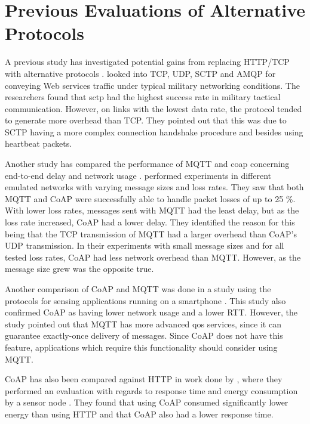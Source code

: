 \section{Previous Evaluations of Alternative Protocols}

A previous study has investigated potential gains from replacing HTTP/TCP with
alternative protocols \cite{evaluation-transport-protocols-web-services}.
 looked into TCP, UDP,
SCTP and AMQP for conveying Web services traffic under typical military
networking conditions. The researchers found that \gls{sctp} had the highest
success rate in military tactical communication. However, on links with the
lowest data rate, the protocol tended to generate more overhead than TCP. They
pointed out that this was due to SCTP having a more complex connection handshake
procedure and besides using heartbeat packets.

Another study has compared the performance of MQTT and \gls{coap} concerning
end-to-end delay and network usage \cite{thangavel-mqtt-coap}.
 performed experiments in different emulated
networks with varying message sizes and loss rates. They saw that both MQTT and
CoAP were successfully able to handle packet losses of up to 25 \%. With lower
loss rates, messages sent with MQTT had the least delay, but as the loss rate
increased, CoAP had a lower delay. They identified the reason for this being
that the TCP transmission of MQTT had a larger overhead than CoAP's UDP
transmission. In their experiments with small message sizes and for all tested
loss rates, CoAP had less network overhead than MQTT. However, as the message
size grew was the opposite true.

Another comparison of CoAP and MQTT was done in a study using the protocols for
sensing applications running on a smartphone \cite{caro-mqtt-coap}. This study
also confirmed CoAP as having lower network usage and a lower RTT. However, the
study pointed out that MQTT has more advanced \gls{qos} services, since it can
guarantee exactly-once delivery of messages. Since CoAP does not have this
feature, applications which require this functionality should consider using
MQTT.

CoAP has also been compared against HTTP in work done by
\citeauthor{walter-coap-http}, where they performed an evaluation with regards
to response time and energy consumption by a sensor node
\cite{walter-coap-http}. They found that using CoAP consumed significantly lower
energy than using HTTP and that CoAP also had  a lower response time.

